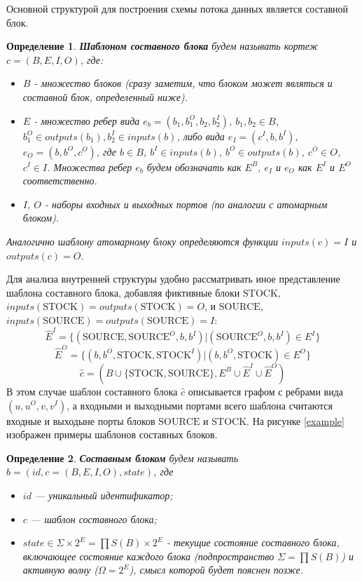 \documentclass[10pt,a4paper]{article}
\newtheorem{defen}{Определение}
\newcommand{\stock}{\text{STOCK}}
\newcommand{\source}{\text{SOURCE}}
\begin{document}
Основной структурой для построения схемы потока данных является составной блок.

\begin{defen}
 \textbf{Шаблоном составного блока} будем называть кортеж $c = (B, E, I, O)$, где:
 \begin{itemize}
    \item $B$ - множество блоков (сразу заметим, что блоком может являться и составной блок, определенный ниже).
    \item $E$ - множество ребер вида $e_b = (b_1, b^O_{1}, b_2, b^I_{2})$, $b_1, b_2 \in B$, $b^O_{1} \in outputs(b_1), b^I_{2} \in inputs(b)$,
                либо вида $e_I = (c^I, b, b^I)$, $e_O = (b, b^O, c^O)$, где $b \in B$, $b^I \in inputs(b)$, $b^O \in outputs(b)$, $c^O \in O$, $c^I \in I$.
                Множества ребер $e_b$ будем обозначать как $E^B$, $e_I$ и $e_O$ как $E^I$ и $E^O$ соответственно.
    \item $I$, $O$ - наборы входных и выходных портов (по аналогии с атомарным блоком).
  \end{itemize}
  Аналогично шаблону атомарному блоку определяются функции $inputs(c) = I$ и $outputs(c) = O$.
\end{defen}

Для анализа внутренней структуры удобно рассматривать иное представление шаблона составного блока, добавляя фиктивные блоки $\stock$, $inputs(\stock) = outputs(\stock) = O$,
  и $\source$, $inputs(\source) = outputs(\source) = I$:
$$\hat{E}^I = \{(\source, \source^O, b, b^I) \vert (\source^O, b, b^I) \in E^I\}$$
$$\hat{E}^O = \{ (b, b^O, \stock, \stock^I) \vert (b, b^O, \stock) \in E^O \}$$
$$\hat{c} = (B \cup \{\stock, \source\}, E^B \cup \hat{E}^I \cup \hat{E}^O)$$
В этом случае шаблон составного блока $\hat{c}$ описывается графом с ребрами вида $(u, u^O, v, v^I)$,
а входными и выходными портами всего шаблона считаются входные и выходыне порты блоков $\source$ и $\stock$.
На рисунке \ref{example} изображен примеры шаблонов составных блоков.

\begin{defen}
  \textbf{Составным блоком} будем называть $b = (id, c = (B, E, I, O), state)$, где
  \begin{itemize}
    \item $id$ --- уникальный идентификатор;
    \item $c$ --- шаблон составного блока;
    \item $state \in \Sigma \times 2^E = \prod S(B) \times 2^E$ - текущие состояние составного блока, включающее
          состояние каждого блока (подпространство $\Sigma = \prod S(B)$) и активную волну ($\Omega = 2^E$), смысл которой будет пояснен позже.
  \end{itemize}
\end{defen}
\end{document}
